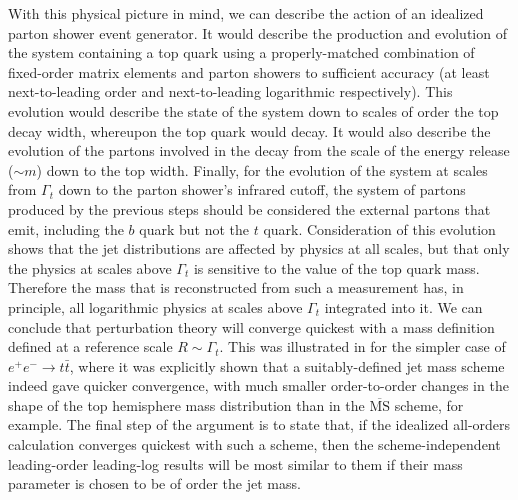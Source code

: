 With this physical picture in mind, we can describe the action of an
idealized parton shower event generator.  It would describe the
production and evolution of the system containing a top quark using a
properly-matched combination of fixed-order matrix elements and parton
showers to sufficient
accuracy (at least next-to-leading order and next-to-leading logarithmic
respectively).  This evolution would describe the state of the system
down to scales of order the top decay width, whereupon the top quark
would decay.  It would also describe the evolution of the partons
involved in the decay from the scale of the energy release ($\sim m$)
down to the top width.  Finally, for the evolution of the system at
scales from $\Gamma_t$ down to the parton shower's infrared cutoff, the
system of partons produced by the previous steps should be considered
the external partons that emit, including the $b$ quark but not the $t$
quark.  Consideration of this evolution shows that the jet distributions
are affected by physics at all scales, but that only the physics at
scales above $\Gamma_t$ is sensitive to the value of the top quark mass.
Therefore the mass that is reconstructed from such a measurement has, in
principle, all logarithmic physics at scales above $\Gamma_t$ integrated
into it.  We can conclude that perturbation theory will converge
quickest with a mass definition defined at a reference scale
$R\sim\Gamma_t$.  This was illustrated in
\cite{Fleming:2007xt,Jain:2008gb} for the
simpler case of $e^+e^-\to t\bar{t}$, where it was explicitly shown that
a suitably-defined jet mass scheme indeed gave quicker convergence, with
much smaller order-to-order changes in the shape of the top hemisphere
mass distribution than in the $\overline{\mathrm{MS}}$ scheme, for
example.  The final step of the argument is to state that, if the
idealized all-orders calculation converges quickest with such a scheme,
then the scheme-independent leading-order leading-log results will be
most similar to them if their mass parameter is chosen to be of order
the jet mass.

